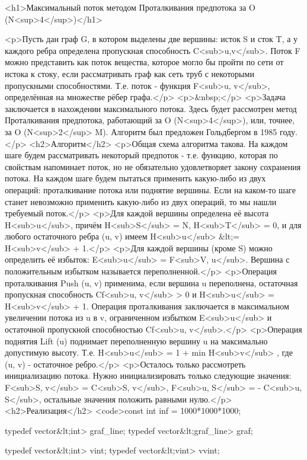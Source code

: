 <h1>Максимальный поток методом Проталкивания предпотока за O (N<sup>4</sup>)</h1>

<p>Пусть дан граф G, в котором выделены две вершины: исток S и сток T, а у каждого ребра определена пропускная способность C<sub>u,v</sub>. Поток F можно представить как поток вещества, которое могло бы пройти по сети от истока к стоку, если рассматривать граф как сеть труб с некоторыми пропускными способностями. Т.е. поток - функция F<sub>u, v</sub>, определённая на множестве рёбер графа.</p>
<p>&nbsp;</p>
<p>Задача заключается в нахождении максимального потока. Здесь будет рассмотрен метод Проталкивания предпотока, работающий за O (N<sup>4</sup>), или, точнее, за O (N<sup>2</sup> M). Алгоритм был предложен Гольдбергом в 1985 году.</p>
<h2>Алгоритм</h2>
<p>Общая схема алгоритма такова. На каждом шаге будем рассматривать некоторый предпоток - т.е. функцию, которая по свойствам напоминает поток, но не обязательно удовлетворяет закону сохранения потока. На каждом шаге будем пытаться применить какую-либо из двух операций: проталкивание потока или поднятие вершины. Если на каком-то шаге станет невозможно применить какую-либо из двух операций, то мы нашли требуемый поток.</p>
<p>Для каждой вершины определена её высота H<sub>u</sub>, причём H<sub>S</sub> = N, H<sub>T</sub> = 0, и для любого остаточного ребра (u, v) имеем H<sub>u</sub> &lt;= H<sub>v</sub> + 1.</p>
<p>Для каждой вершины (кроме S) можно определить её избыток: E<sub>u</sub> = F<sub>V, u</sub>. Вершина с положительным избытком называется переполненной.</p>
<p>Операция проталкивания Push (u, v) применима, если вершина u переполнена, остаточная пропускная способность Cf<sub>u, v</sub> > 0 и H<sub>u</sub> = H<sub>v</sub> + 1. Операция проталкивания заключается в максимальном увеличении потока из u в v, ограниченном избытком E<sub>u</sub> и остаточной пропускной способностью Cf<sub>u, v</sub>.</p>
<p>Операция поднятия Lift (u) поднимает переполненную вершину u на максимально допустимую высоту. Т.е. H<sub>u</sub> = 1 + min { H<sub>v</sub> }, где (u, v) - остаточное ребро.</p>
<p>Осталось только рассмотреть инициализацию потока. Нужно инициализировать только следующие значения: F<sub>S, v</sub> = C<sub>S, v</sub>, F<sub>u, S</sub> = - C<sub>u, S</sub>, остальные значения положить равными нулю.</p>
<h2>Реализация</h2>
<code>const int inf = 1000*1000*1000;


typedef vector&lt;int> graf_line;
typedef vector&lt;graf_line> graf;

typedef vector&lt;int> vint;
typedef vector&lt;vint> vvint;



